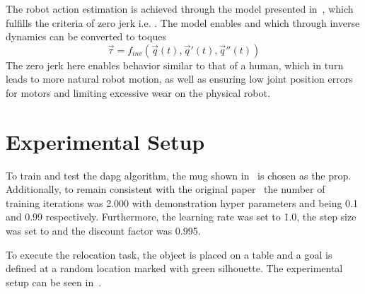 The robot action estimation is achieved through the model  presented in~\cite{smoothness-maximization-along-a-predefined-path-accurately-predicts-the-speed-profiles-of-complex-arm-movements}, which fulfills the criteria of zero jerk i.e. . The model enables  and  which through inverse dynamics can be converted to toques \mvar{\vec{\tau}}
\begin{equation}
    \vec{\tau} = f_{inv}\left(\vec{q}(t),\vec{q}'(t),\vec{q}''(t)\right)
\end{equation}
The zero jerk here enables behavior similar to that of a human, which in turn leads to more natural robot motion, as well as ensuring low joint position errors for motors and limiting excessive wear on the physical robot.

\section{Experimental Setup}\label{sec:3-in-hand-manipulation-experimental-setup}

To train and test the \gls{dapg} algorithm, the mug shown in~ is chosen as the prop. Additionally, to remain consistent with the original paper~\cite{dexmv:-imitation-learning-for-dexterous-manipulation-from-human-videos} the number of training iterations was \num{2,000} with demonstration hyper parameters  and  being \num{0.1} and \num{0.99} respectively. Furthermore, the learning rate  was set to \num{1.0}, the step size \mvar{\delta} was set to  and the discount factor \mvar{\gamma} was \num{0.995}. \medskip

To execute the relocation task, the object is placed on a table and a goal is defined at a random location marked with green silhouette. The experimental setup can be seen in~.

